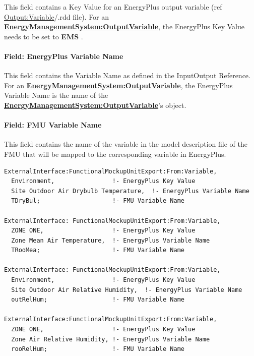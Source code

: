 This field contains a Key Value for an EnergyPlus output variable (ref \hyperref[outputvariable]{Output:Variable}/.rdd file). For an \textbf{\hyperref[energymanagementsystemoutputvariable]{EnergyManagementSystem:OutputVariable}}, the EnergyPlus Key Value needs to be set to \textbf{EMS} .

\paragraph{Field: EnergyPlus Variable Name}\label{field-energyplus-variable-name-4}

This field contains the Variable Name as defined in the InputOutput Reference. For an \textbf{\hyperref[energymanagementsystemoutputvariable]{EnergyManagementSystem:OutputVariable}}, the EnergyPlus Variable Name is the name of the \textbf{\hyperref[energymanagementsystemoutputvariable]{EnergyManagementSystem:OutputVariable}}'s object.

\paragraph{Field: FMU Variable Name}\label{field-fmu-variable-name-4}

This field contains the name of the variable in the model description file of the FMU that will be mapped to the corresponding variable in EnergyPlus.

\begin{lstlisting}
ExternalInterface:FunctionalMockupUnitExport:From:Variable,
  Environment,                !- EnergyPlus Key Value
  Site Outdoor Air Drybulb Temperature,  !- EnergyPlus Variable Name
  TDryBul;                    !- FMU Variable Name

ExternalInterface: FunctionalMockupUnitExport:From:Variable,
  ZONE ONE,                   !- EnergyPlus Key Value
  Zone Mean Air Temperature,  !- EnergyPlus Variable Name
  TRooMea;                    !- FMU Variable Name

ExternalInterface: FunctionalMockupUnitExport:From:Variable,
  Environment,                !- EnergyPlus Key Value
  Site Outdoor Air Relative Humidity,  !- EnergyPlus Variable Name
  outRelHum;                  !- FMU Variable Name

ExternalInterface:FunctionalMockupUnitExport:From:Variable,
  ZONE ONE,                   !- EnergyPlus Key Value
  Zone Air Relative Humidity, !- EnergyPlus Variable Name
  rooRelHum;                  !- FMU Variable Name
\end{lstlisting}

